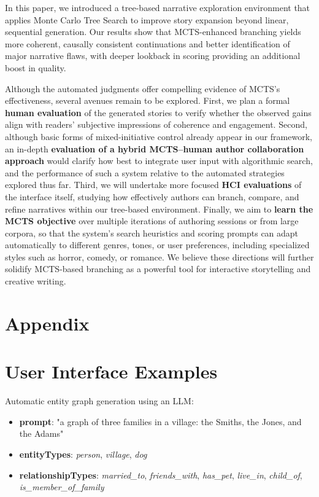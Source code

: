 \documentclass[11pt]{article}
\begin{document}
In this paper, we introduced a tree-based narrative exploration environment that applies Monte Carlo Tree Search to improve story expansion beyond linear, sequential generation. Our results show that MCTS-enhanced branching yields more coherent, causally consistent continuations and better identification of major narrative flaws, with deeper lookback in scoring providing an additional boost in quality.

Although the automated judgments offer compelling evidence of MCTS's effectiveness, several avenues remain to be explored. First, we plan a formal \textbf{human evaluation} of the generated stories to verify whether the observed gains align with readers' subjective impressions of coherence and engagement. Second, although basic forms of mixed-initiative control already appear in our framework, an in-depth \textbf{evaluation of a hybrid MCTS--human author collaboration approach} would clarify how best to integrate user input with algorithmic search, and the performance of such a system relative to the automated strategies explored thus far. Third, we will undertake more focused \textbf{HCI evaluations} of the interface itself, studying how effectively authors can branch, compare, and refine narratives within our tree-based environment. Finally, we aim to \textbf{learn the MCTS objective} over multiple iterations of authoring sessions or from large corpora, so that the system's search heuristics and scoring prompts can adapt automatically to different genres, tones, or user preferences, including specialized styles such as horror, comedy, or romance. We believe these directions will further solidify MCTS-based branching as a powerful tool for interactive storytelling and creative writing.




\appendix
\onecolumn
\section{Appendix}

\section{User Interface Examples}
\label{appendix:ui-examples}

Automatic entity graph generation using an LLM:

\begin{itemize}
    \item \textbf{prompt}: "a graph of three families in a village: the Smiths, the Jones, and the Adams"
    \item \textbf{entityTypes}: \textit{person}, \textit{village}, \textit{dog}
    \item \textbf{relationshipTypes}: \textit{married\_to}, \textit{friends\_with}, \textit{has\_pet}, \textit{live\_in}, \textit{child\_of}, \textit{is\_member\_of\_family}
\end{itemize}
\end{document}
